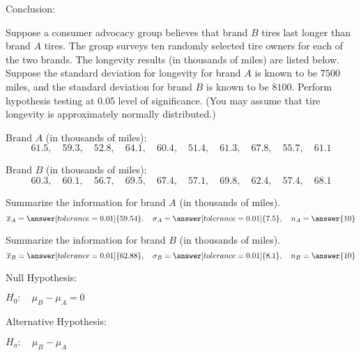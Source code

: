 \documentclass{ximera}
\begin{document}
\begin{problem}
Conclusion:

\begin{multipleChoice} 
\end{multipleChoice} 
\end{problem}

 \begin{problem}\label{prob:140hom9prob2}
 Suppose a consumer advocacy group believes that brand $B$ tires last longer than brand $A$ tires.  The group surveys ten randomly selected tire owners for each of the two brands.  The longevity results (in thousands of miles) are listed below.  Suppose the standard deviation for longevity for brand $A$ is known to be $7500$ miles, and the standard deviation for brand $B$ is known to be $8100$.  Perform hypothesis testing at 0.05 level of significance. (You may assume that tire longevity is approximately normally distributed.)

Brand $A$ (in thousands of miles): $$61.5,\quad 59.3,\quad 52.8,\quad 64.1,\quad 60.4,\quad 51.4,\quad 61.3,\quad 67.8,\quad 55.7,\quad 61.1$$

Brand $B$ (in thousands of miles): $$60.3,\quad 60.1, \quad 56.7,\quad 69.5, \quad 67.4,\quad 57.1,\quad 69.8,\quad 62.4,\quad 57.4,\quad 68.1$$

Summarize the information for brand $A$ (in thousands of miles).
$$\overline{x}_A=\answer[tolerance=0.01]{59.54},\quad \sigma_A=\answer[tolerance=0.01]{7.5},\quad n_A=\answer{10}$$

Summarize the information for brand $B$ (in thousands of miles).
$$\overline{x}_B=\answer[tolerance=0.01]{62.88},\quad \sigma_B=\answer[tolerance=0.01]{8.1},\quad n_B=\answer{10}$$

Null Hypothesis:

$H_0:\quad \mu_B-\mu_A=0$ 

Alternative Hypothesis:

$H_a:\quad \mu_B-\mu_A$ 


\end{problem}
\end{document}
